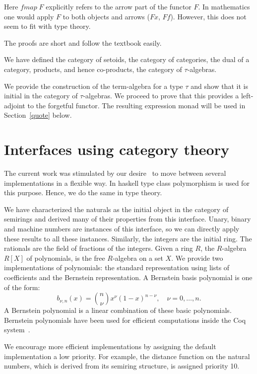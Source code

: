 \documentclass[a4paper,10pt, runningheads]{llncs}
\newcommand{\Conid}[1]{\mathit{#1}}
\newcommand{\Varid}[1]{\mathit{#1}}
\def\resethooks{%
  \global\let\SaveRestoreHook\empty
  \global\let\ColumnHook\empty}
\let\hspre\empty
\let\hspost\empty
\begin{document}
Here \ensuremath{\Varid{fmap}\;\Conid{F}} explicitly refers to the arrow part of the functor \ensuremath{\Conid{F}}.
In mathematics one would apply $F$ to both objects and arrows ($F x$, $F f$). However, this does
not seem to fit with type theory.

The proofs are short and follow the textbook easily.

We have defined the category of setoids, the category of categories, the dual of a category,
products, and hence co-products, the category of $\tau$-algebras.

We provide the construction of the term-algebra for a type $\tau$ and show that it is
initial in the category of $\tau$-algebras. We proceed to prove that this provides a left-adjoint
to the forgetful functor. The resulting expression monad will be used in Section~\ref{quote} below.

\section{Interfaces using category theory}\label{interfaces}\label{modul}
The current work was stimulated by our desire~\cite{Riemann} to move between several
implementations in a flexible way. In haskell type class polymorphism is used for this purpose.
Hence, we do the same in type theory.

We have characterized the naturals as the initial object in the category of semirings and derived
many of their properties from this interface. Unary, binary and machine numbers are
instances of this interface, so we can directly apply these results to all these instances.
Similarly, the integers are the initial ring. The rationals are the field of fractions of the
integers. 
Given a ring $R$, the $R$-algebra $R[X]$ of polynomials, is the free $R$-algebra on a set $X$.
We provide two implementations of polynomials: the
standard representation using lists of coefficients and the Bernstein representation. A Bernstein
basis polynomial is one of the form:
\[b_{\nu,n}(x) = {n \choose \nu} x^{\nu} \left( 1 - x \right)^{n - \nu}, \quad \nu = 0, \ldots, n.\]
A Bernstein polynomial is a linear combination of these basic polynomials. Bernstein polynomials
have been used for efficient computations inside the Coq system~\cite{ZumkellerPhD}.

We encourage more efficient implementations by assigning the default implementation a
low priority. For example, the distance function on the natural numbers, which is derived from its
semiring structure, is assigned priority 10.
\begin{hscode}\SaveRestoreHook
\column{B}{@{}>{\hspre}l<{\hspost}@{}}%
\column{3}{@{}>{\hspre}l<{\hspost}@{}}%
\column{E}{@{}>{\hspre}l<{\hspost}@{}}%
\>[3]{}\;\;\Conid{Instance:}\;\Conid{NatDistance}\;\Conid{N}\;\mid \;\Varid{10}\;\Conid{:=}\;\Varid{...}{}\<[E]%
\ColumnHook
\end{hscode}\resethooks
\end{document}
